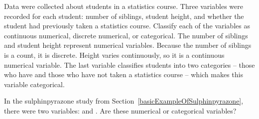\begin{example}{Data were collected about students in a statistics course. Three variables were recorded for each student: number of siblings, student height, and whether the student had previously taken a statistics course. Classify each of the variables as continuous numerical, discrete numerical, or categorical.}
The number of siblings and student height represent numerical variables. Because the number of siblings is a count, it is discrete. Height varies continuously, so it is a continuous numerical variable. The last variable classifies students into two categories -- those who have and those who have not taken a statistics course -- which makes this variable categorical.
\end{example}

\begin{exercise}
In the sulphinpyrazone study from Section~\ref{basicExampleOfSulphinpyrazone}, there were two variables:  and . Are these numerical or categorical variables?
\end{exercise}




